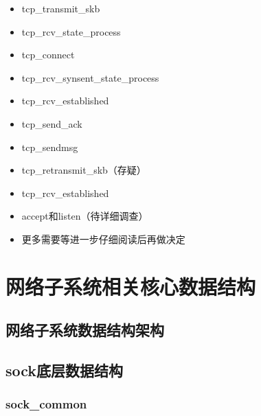 \documentclass[11pt, a4paper,oneside]{book}
\theoremstyle{ocrenumbox}
\theoremstyle{purplenumbox}
\theoremstyle{blackbox}
\begin{document}
\begin{itemize}
\item
  tcp\_transmit\_skb
\item
  tcp\_rcv\_state\_process
\item
  tcp\_connect
\item
  tcp\_rcv\_synsent\_state\_process
\item
  tcp\_rcv\_established
\item
  tcp\_send\_ack
\item
  tcp\_sendmsg
\item
  tcp\_retransmit\_skb（存疑）
\item
  tcp\_rcv\_established
\item
  accept和listen（待详细调查）
\item
  更多需要等进一步仔细阅读后再做决定
\end{itemize}
\chapter{网络子系统相关核心数据结构}
\minitoc
	\section{网络子系统数据结构架构}	
	\section{sock底层数据结构}	
		\subsection{sock\_common}
\end{document}
